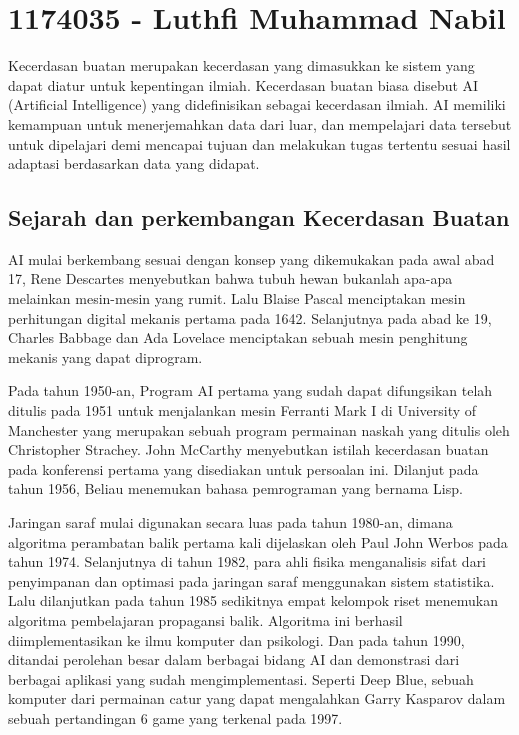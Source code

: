 \section{1174035 - Luthfi Muhammad Nabil}
Kecerdasan buatan merupakan kecerdasan yang dimasukkan ke sistem yang dapat diatur untuk kepentingan ilmiah. Kecerdasan buatan biasa disebut AI (Artificial Intelligence) yang didefinisikan sebagai kecerdasan ilmiah. AI memiliki kemampuan untuk menerjemahkan data dari luar, dan mempelajari data tersebut untuk dipelajari demi mencapai tujuan dan melakukan tugas tertentu sesuai hasil adaptasi berdasarkan data yang didapat. 

\subsection{Sejarah dan perkembangan Kecerdasan Buatan}
AI mulai berkembang sesuai dengan konsep yang dikemukakan pada awal abad 17, Rene Descartes menyebutkan bahwa tubuh hewan bukanlah apa-apa melainkan mesin-mesin yang rumit. Lalu Blaise Pascal menciptakan mesin perhitungan digital mekanis pertama pada 1642. Selanjutnya pada abad ke 19, Charles Babbage dan Ada Lovelace menciptakan sebuah mesin penghitung mekanis yang dapat diprogram.

Pada tahun 1950-an, Program AI pertama yang sudah dapat difungsikan telah ditulis pada 1951 untuk menjalankan mesin Ferranti Mark I di University of Manchester yang merupakan sebuah program permainan naskah yang ditulis oleh Christopher Strachey. John McCarthy menyebutkan istilah kecerdasan buatan pada konferensi pertama yang disediakan untuk persoalan ini. Dilanjut pada tahun 1956, Beliau menemukan bahasa pemrograman yang bernama Lisp.

Jaringan saraf mulai digunakan secara luas pada tahun 1980-an, dimana algoritma perambatan balik pertama kali dijelaskan oleh Paul John Werbos pada tahun 1974. Selanjutnya di tahun 1982, para ahli fisika menganalisis sifat dari penyimpanan dan optimasi pada jaringan saraf menggunakan sistem statistika. Lalu dilanjutkan pada tahun 1985 sedikitnya empat kelompok riset menemukan algoritma pembelajaran propagansi balik. Algoritma ini berhasil diimplementasikan ke ilmu komputer dan psikologi. Dan pada tahun 1990, ditandai perolehan besar dalam berbagai bidang AI dan demonstrasi dari berbagai aplikasi yang sudah mengimplementasi. Seperti Deep Blue, sebuah komputer dari permainan catur yang dapat mengalahkan Garry Kasparov dalam sebuah pertandingan 6 game yang terkenal pada 1997. 


